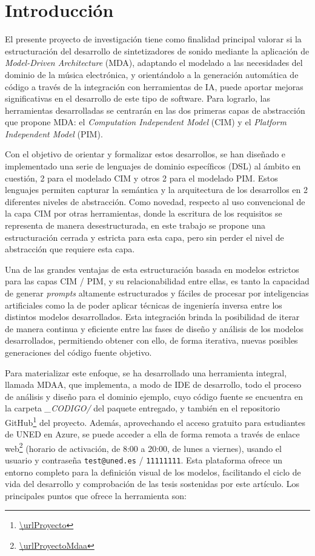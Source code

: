 \section{Introducción}

El presente proyecto de investigación tiene como finalidad principal valorar si la estructuración del desarrollo de sintetizadores de sonido mediante la aplicación de \textit{Model-Driven Architecture} (MDA), adaptando el modelado a las necesidades del dominio de la música electrónica, y orientándolo a la generación automática de código a través de la integración con herramientas de IA, puede aportar mejoras significativas en el desarrollo de este tipo de software. Para lograrlo, las herramientas desarrolladas se centrarán en las dos primeras capas de abstracción que propone MDA: el \textit{Computation Independent Model} (CIM) y el \textit{Platform Independent Model} (PIM).

Con el objetivo de orientar y formalizar estos desarrollos, se han diseñado e implementado una serie de lenguajes de dominio específicos (DSL) al ámbito en cuestión, 2 para el modelado CIM y otros 2 para el modelado PIM. Estos lenguajes permiten capturar la semántica y la arquitectura de los desarrollos en 2 diferentes niveles de abstracción. Como novedad, respecto al uso convencional de la capa CIM por otras herramientas, donde la escritura de los requisitos se representa de manera desestructurada, en este trabajo se propone una estructuración cerrada y estricta para esta capa, pero sin perder el nivel de abstracción que requiere esta capa. 

Una de las grandes ventajas de esta estructuración basada en modelos estrictos para las capas CIM / PIM, y su relacionabilidad entre ellas, es tanto la capacidad de generar \textit{prompts} altamente estructurados y fáciles de procesar por inteligencias artificiales como la de poder aplicar técnicas de ingeniería inversa entre los distintos modelos desarrollados. Esta integración brinda la posibilidad de iterar de manera continua y eficiente entre las fases de diseño y análisis de los modelos desarrollados, permitiendo obtener con ello, de forma iterativa, nuevas posibles generaciones del código fuente objetivo.

Para materializar este enfoque, se ha desarrollado una herramienta integral, llamada MDAA, que implementa, a modo de IDE de desarrollo, todo el proceso de análisis y diseño para el dominio ejemplo, cuyo código fuente se encuentra en la carpeta \textit{\_CODIGO/} del paquete entregado, y también en el repositorio GitHub\footnote{\url{\urlProyecto}} del proyecto. Además, aprovechando el acceso gratuito para estudiantes de UNED en Azure, se puede acceder a ella de forma remota a través de enlace web\footnote{\url{\urlProyectoMdaa}} (horario de activación, de 8:00 a 20:00, de lunes a viernes), usando el usuario y contraseña \texttt{test@uned.es} / \texttt{11111111}. Esta plataforma ofrece un entorno completo para la definición visual de los modelos, facilitando el ciclo de vida del desarrollo y comprobación de las tesis sostenidas por este artículo. Los principales puntos que ofrece la herramienta son:

